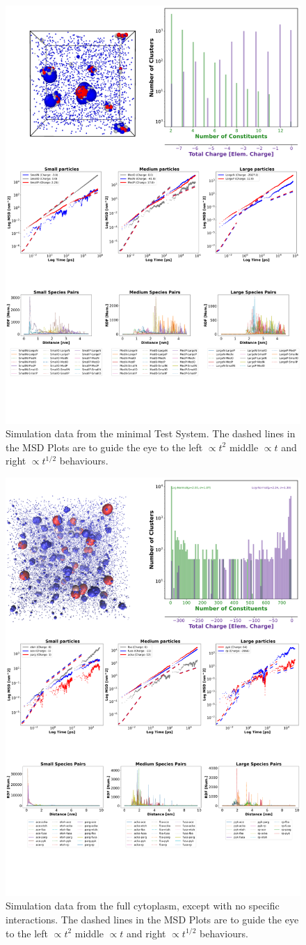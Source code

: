 \documentclass[a4paper,11pt,oneside]{book}
\begin{document}
\begin{figure}[!htbp]
\centering
\includegraphics[width=0.7\linewidth]{files/Fig6-a7ed5a88b4f52cd6f742db9bb56d35f3.png}
\caption[]{Simulation data from the minimal Test System. The dashed lines in the MSD Plots are to guide the eye to the left $\propto t^2$ middle $\propto t$ and right $\propto t^{1/2}$ behaviours.}
\label{Fig6_TestSys}
\end{figure}

\begin{figure}[!htbp]
\centering
\includegraphics[width=0.7\linewidth]{files/Fig7-52255c465b726bd0729aff0b90c8f0ed.png}
\caption[]{Simulation data from the full cytoplasm, except with no specific interactions. The dashed lines in the MSD Plots are to guide the eye to the left $\propto t^2$ middle $\propto t$ and right $\propto t^{1/2}$ behaviours.}
\label{Fig7_NoQTestSys}
\end{figure}
\end{document}
